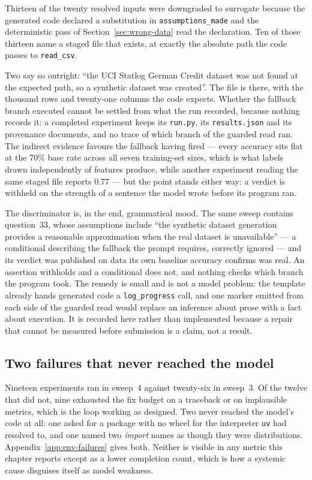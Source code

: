 Thirteen of the twenty resolved inputs were downgraded to surrogate because the
generated code declared a substitution in \texttt{assumptions\_made} and the
deterministic pass of Section~\ref{sec:wrong-data} read the declaration. Ten of
those thirteen name a staged file that exists, at exactly the absolute path the
code passes to \texttt{read\_csv}.

Two say so outright: ``the UCI Statlog German Credit dataset was not found at the
expected path, so a synthetic dataset was created''. The file is there, with the
thousand rows and twenty-one columns the code expects. Whether the fallback branch
executed cannot be settled from what the run recorded, because nothing records it: a
completed experiment keeps its \texttt{run.py}, its \texttt{results.json} and its
provenance documents, and no trace of which branch of the guarded read ran. The
indirect evidence favours the fallback having fired --- every accuracy sits flat at
the 70\% base rate across all seven training-set sizes, which is what labels drawn
independently of features produce, while another experiment reading the same staged
file reports 0.77 --- but the point stands either way: a verdict is withheld on the
strength of a sentence the model wrote before its program ran.

The discriminator is, in the end, grammatical mood. The same sweep contains
question~33, whose assumptions include ``the synthetic dataset generation provides a
reasonable approximation when the real dataset is unavailable'' --- a conditional
describing the fallback the prompt requires, correctly ignored --- and its verdict
was published on data its own baseline accuracy confirms was real. An assertion
withholds and a conditional does not, and nothing checks which branch the program
took. The remedy is small and is not a model problem: the template already hands
generated code a \texttt{log\_progress} call, and one marker emitted from each side
of the guarded read would replace an inference about prose with a fact about
execution. It is recorded here rather than implemented because a repair that cannot
be measured before submission is a claim, not a result.

\subsection{Two failures that never reached the model}

Nineteen experiments ran in sweep~4 against twenty-six in sweep~3. Of the twelve
that did not, nine exhausted the fix budget on a traceback or on implausible
metrics, which is the loop working as designed. Two never reached the model's code
at all: one asked for a package with no wheel for the interpreter \texttt{uv} had
resolved to, and one named two \emph{import} names as though they were
distributions. Appendix~\ref{app:env-failures} gives both. Neither is visible in
any metric this chapter reports except as a lower completion count, which is how a
systemic cause disguises itself as model weakness.

